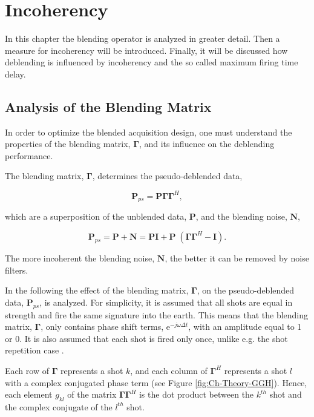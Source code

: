 \chapter{Incoherency} \label{chap:Incoherency}

In this chapter the blending operator is analyzed in greater detail. Then a measure for incoherency will be introduced. Finally, it will be discussed how deblending is influenced by incoherency and the so called maximum firing time delay.

\section{Analysis of the Blending Matrix} \label{sec:BlendingMatrix}

In order to optimize the blended acquisition design, one must understand the properties of the blending matrix, $\mathbf{\Gamma}$, and its influence on the deblending performance.

The blending matrix, $\mathbf{\Gamma}$, determines the pseudo-deblended data,

\begin{equation}
	\mathbf{P}_{ps} = \mathbf{P \Gamma \Gamma}^H,
	\label{eq:Ch-Theory-Pseudo-Deblended-Data}
\end{equation}

which are a superposition of the unblended data, $\mathbf{P}$, and the blending noise, $\mathbf{N}$,

\begin{equation}
	\mathbf{P}_{ps} = \mathbf{P} + \mathbf{N} = \mathbf{P I} + \mathbf{P} \; (\mathbf{\Gamma \Gamma}^H - \mathbf{I}).
	\label{eq:Ch-Theory-PseudoSuperposition}
\end{equation}

The more incoherent the blending noise, $\mathbf{N}$, the better it can be removed by noise filters.

In the following the effect of the blending matrix, $\mathbf{\Gamma}$, on the pseudo-deblended data, $\mathbf{P}_{ps}$, is analyzed. For simplicity, it is assumed that all shots are equal in strength and fire the same signature into the earth. This means that the blending matrix, $\mathbf{\Gamma}$, only contains phase shift terms, $\mathrm{e}^{-j \omega \Delta t}$, with an amplitude equal to 1 or 0. It is also assumed that each shot is fired only once, unlike e.g. the shot repetition case \citep{Sixue}.

Each row of $\mathbf{\Gamma}$ represents a shot $k$, and each column of $\mathbf{\Gamma}^H$ represents a shot $l$ with a complex conjugated phase term (see Figure \ref{fig:Ch-Theory-GGH}). Hence, each element $g_{kl}$ of the matrix $\mathbf{\Gamma \Gamma}^H$ is the dot product between the $k^{th}$ shot and the complex conjugate of the $l^{th}$ shot.

